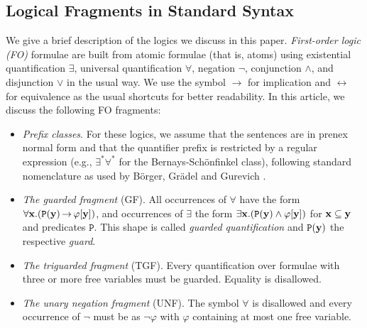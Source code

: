 \documentclass[10pt,a4paper]{amsart}
\theoremstyle{definition}
\numberwithin{equation}{section}
\theoremstyle{plain}
\theoremstyle{definition}
\theoremstyle{myexample}
\theoremstyle{plain}
\theoremstyle{definition}
\newcommand{\pred}[1]{\mathtt{#1}}
\begin{document}
\subsection{Logical Fragments in Standard Syntax}\label{app:standardFO}
\newcommand{\sigP}{\pred{P}}
We give a brief description of the logics we discuss in this paper. 
\emph{First-order logic (FO)} formulae are built from atomic formulae (that is, atoms) using 
existential quantification $\exists$, universal quantification $\forall$, negation $\neg$, conjunction $\wedge$, and disjunction $\vee$ in the usual way.
We use the symbol $\rightarrow$ for implication and $\leftrightarrow$ for equivalence as the usual shortcuts for better readability. 
In this article, we discuss the following FO fragments:
\begin{itemize}
	\item
	\emph{Prefix classes}. 
	For these logics, we assume that the sentences are in prenex normal form and that the quantifier prefix is restricted by a regular expression (e.g., $\exists^*\forall^*$ for the Bernays-Schönfinkel class), following 
	standard nomenclature as used by Börger, Grädel and Gurevich \cite{BorgerGG1997}. 
	\item 
	\emph{The guarded fragment} (GF). %
	All occurrences of $\forall$ have the form 
	$\forall \bold{x}.(\sigP(\bold{y}) {\,\rightarrow\,} \varphi[\bold{y}])$, 
	and occurrences of $\exists$ the form 
	$\exists \bold{x}.(\sigP(\bold{y}) \wedge \varphi[\bold{y}])$
	for $\bold{x} \subseteq \bold{y}$ and predicates $\sigP{}$.
	This shape is called \emph{guarded quantification} and $\sigP(\bold{y})$ the respective \emph{guard}.
	\item
	\emph{The triguarded fragment} (TGF). Every quantification over formulae with three or more free variables must be guarded. Equality is disallowed.
	\item
	\emph{The unary negation fragment} (UNF). The symbol $\forall$ is disallowed 
	and every occurrence of $\neg$ must be as
	$\neg \varphi$ with $\varphi$ containing at most one free variable.

\end{itemize}
\end{document}
